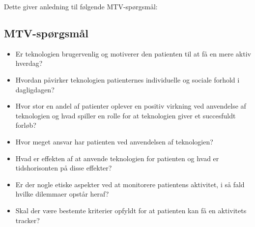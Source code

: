 \noindent
Dette giver anledning til følgende MTV-spørgsmål: 


\subsection{MTV-spørgsmål}
\begin{itemize}
\item Er teknologien brugervenlig og motiverer den patienten til at få en mere aktiv hverdag?
\item Hvordan påvirker teknologien patienternes individuelle og sociale forhold i dagligdagen?
\item Hvor stor en andel af patienter oplever en positiv virkning ved anvendelse af teknologien og hvad spiller en rolle for at teknologien giver et succesfuldt forløb?
\item Hvor meget ansvar har patienten ved anvendelsen af teknologien?
\item Hvad er effekten af at anvende teknologien for patienten og hvad er tidshorisonten på disse effekter? 
\item Er der nogle etiske aspekter ved at monitorere patientens aktivitet, i så fald hvilke dilemmaer opstår heraf?
\item Skal der være bestemte kriterier opfyldt for at patienten kan få en aktivitets tracker?
\end{itemize} 

